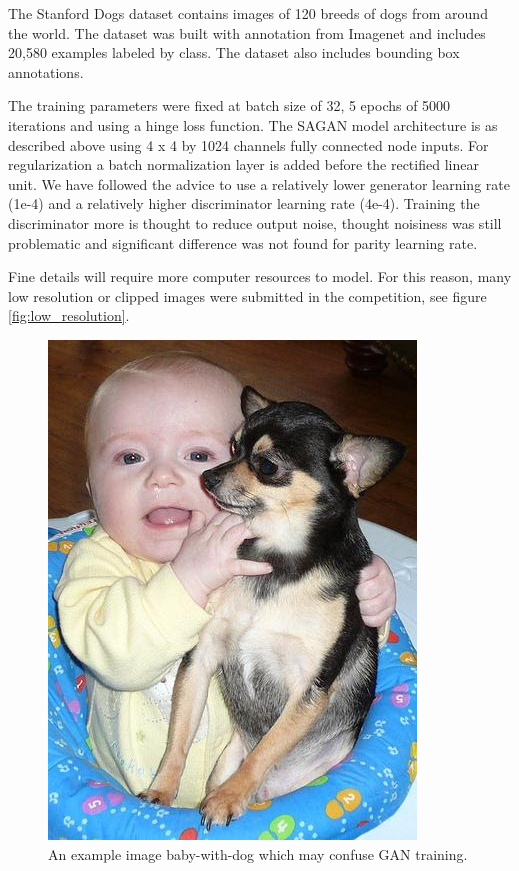 \documentclass[10pt,twocolumn,letterpaper]{article}
\begin{document}
The Stanford Dogs dataset contains images of 120 breeds of dogs from around the world.
The dataset was built with annotation from Imagenet and includes 20,580 examples
labeled by class. The dataset also includes bounding box annotations.

The training parameters were fixed at batch size of 32, 5 epochs of 5000 iterations
and using a hinge loss function. The SAGAN model architecture is as described above using
4 x 4 by 1024 channels fully connected node inputs. For regularization a batch
normalization layer is added before the rectified linear unit. We have followed the
advice to use a relatively lower generator learning rate (1e-4) and a relatively higher
discriminator learning rate (4e-4). Training the discriminator more is thought to reduce
output noise, thought noisiness was still problematic and significant difference was not
found for parity learning rate.

Fine details will require more computer resources to model. For this reason, many
low resolution or clipped images were submitted in the competition, see figure
\ref{fig:low_resolution}.

\begin{figure}
  \includegraphics[width=0.7\linewidth]{images/confounder.jpg}
  \caption{An example image baby-with-dog which may confuse GAN training.}
  \label{fig:confouder}
\end{figure}
\end{document}
